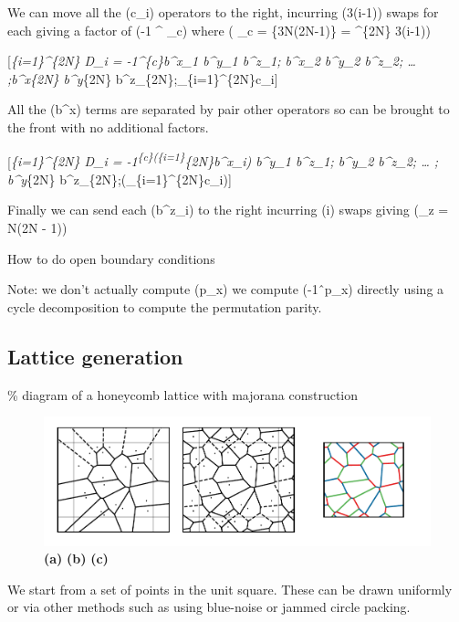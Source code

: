 We can move all the (c\_i) operators to the right, incurring (3(i-1))
swaps for each giving a factor of (-1 \^{} \theta\_c) where ( \theta\_c
= \{3N(2N-1)\} = \^{}\{2N\} 3(i-1))

{[}\prod\emph{\{i=1\}\^{}\{2N\} D\_i = -1\^{}\{\theta\emph{c\}b\^{}x\_1
b\^{}y\_1 b\^{}z\_1; b\^{}x\_2 b\^{}y\_2 b\^{}z\_2; \ldots{}
;b\^{}x}\{2N\} b\^{}y}\{2N\}
b\^{}z\_\{2N\};\prod\_\{i=1\}\^{}\{2N\}c\_i{]}

All the (b\^{}x) terms are separated by pair other operators so can be
brought to the front with no additional factors.

{[}\prod\emph{\{i=1\}\^{}\{2N\} D\_i =
-1\textsuperscript{\{\theta\emph{c\}\left(\prod}\{i=1\}}\{2N\}b\^{}x\_i\right)
b\^{}y\_1 b\^{}z\_1; b\^{}y\_2 b\^{}z\_2; \ldots{} ; b\^{}y}\{2N\}
b\^{}z\_\{2N\};\left(\prod\_\{i=1\}\^{}\{2N\}c\_i\right){]}

Finally we can send each (b\^{}z\_i) to the right incurring (i) swaps
giving (\theta\_z = N(2N - 1))

How to do open boundary conditions

Note: we don't actually compute (p\_x) we compute (-1ˆp\_x) directly
using a cycle decomposition to compute the permutation parity.

\subsection{Lattice generation}

\% diagram of a honeycomb lattice with majorana construction

\begin{figure}
    \centering
    \includegraphics[width=\columnwidth]{figure_code/amk_chapter/lattice_construction/lattice_construction}
    \caption{\textbf{(a)}  \textbf{(b)}  \textbf{(c)} }
    \label{fig:honeycomb_zoom}
\end{figure}

We start from a set of points in the unit square. These can be drawn
uniformly or via other methods such as using blue-noise or jammed circle
packing.

